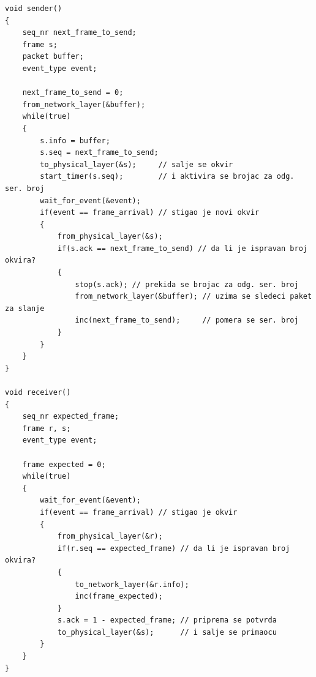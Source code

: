 \documentclass[a4paper]{article}
\begin{document}
\newpage
\begin{lstlisting}
void sender()
{
    seq_nr next_frame_to_send;
    frame s;
    packet buffer;
    event_type event;
    
    next_frame_to_send = 0;
    from_network_layer(&buffer);
    while(true)
    {
        s.info = buffer;
        s.seq = next_frame_to_send;
        to_physical_layer(&s);     // salje se okvir 
        start_timer(s.seq);        // i aktivira se brojac za odg. ser. broj
        wait_for_event(&event);   
        if(event == frame_arrival) // stigao je novi okvir
        {
            from_physical_layer(&s);
            if(s.ack == next_frame_to_send) // da li je ispravan broj okvira?
            {
                stop(s.ack); // prekida se brojac za odg. ser. broj
                from_network_layer(&buffer); // uzima se sledeci paket za slanje
                inc(next_frame_to_send);     // pomera se ser. broj
            }
        }
    }
}

void receiver()
{
    seq_nr expected_frame;
    frame r, s;
    event_type event;

    frame expected = 0;
    while(true)
    {
        wait_for_event(&event);
        if(event == frame_arrival) // stigao je okvir
        {
            from_physical_layer(&r);
            if(r.seq == expected_frame) // da li je ispravan broj okvira?
            {
                to_network_layer(&r.info);
                inc(frame_expected);
            }
            s.ack = 1 - expected_frame; // priprema se potvrda
            to_physical_layer(&s);      // i salje se primaocu
        }
    }
}
\end{lstlisting} 
\end{document}
